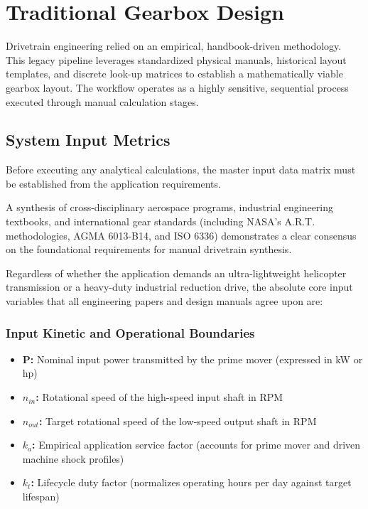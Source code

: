 \section{Traditional Gearbox Design}
	Drivetrain engineering relied on an empirical, handbook-driven methodology. This legacy pipeline leverages standardized physical manuals, historical layout 
	templates, and discrete look-up matrices to establish a mathematically viable gearbox layout. The workflow operates as a highly sensitive, sequential process 
	executed through manual calculation stages. 

	\subsection{System Input Metrics}
		Before executing any analytical calculations, the master input data matrix must be established from the application requirements. 

		A synthesis of cross-disciplinary aerospace programs, industrial engineering textbooks, and international gear standards (including NASA's A.R.T. methodologies, 
		AGMA 6013-B14, and ISO 6336) demonstrates a clear consensus on the foundational requirements for manual drivetrain synthesis. 

		Regardless of whether the application demands an ultra-lightweight helicopter 
		transmission or a heavy-duty industrial reduction drive, the absolute core 
		input variables that all engineering papers and design manuals agree upon are: 

		\subsubsection{Input Kinetic and Operational Boundaries}
			\begin{itemize}
				\item \textbf{P:} Nominal input power transmitted by the prime mover (expressed in kW or hp)
				\item \textbf{$n_{in}$:} Rotational speed of the high-speed input shaft in RPM
				\item \textbf{$n_{out}$:} Target rotational speed of the low-speed output shaft in RPM
				\item \textbf{$k_{a}$:} Empirical application service factor (accounts for prime mover and driven machine shock profiles)
				\item \textbf{$k_{t}$:} Lifecycle duty factor (normalizes operating hours per day against target lifespan)
			\end{itemize}

